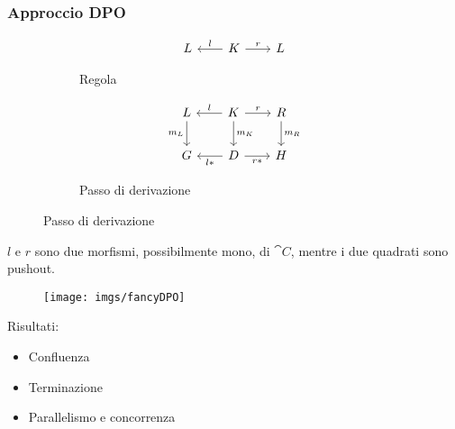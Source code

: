 \documentclass[8pt]{beamer}
\begin{document}
\begin{frame}[fragile]\frametitle{Approccio DPO}
	\begin{figure}[h]
		\begin{subfigure}{0.25\textwidth}
			\[\begin{tikzcd}[row sep = 20, column sep = 20] L & K \arrow[r, "r"] \arrow[l, "l"swap] & L \end{tikzcd}\]
		\label{fig:rule}
		\caption{Regola}
		\end{subfigure}
		\qquad
		\begin{subfigure}{0.25\textwidth}
			\[\begin{tikzcd}[row sep = 20, column sep = 20]
			L \arrow[d, "{m_L}"swap] & K\arrow[d, "{m_K}"] \arrow[r, "r"] \arrow[l, "l"swap] & R \arrow[d, "{m_R}"] \\
				G & D \arrow[l, "{l*}"] \arrow[r, "{r*}"swap] & H
		\end{tikzcd}\]
		\caption{Passo di derivazione}
		\label{fig:step}
		\end{subfigure}
	\end{figure}
	$l$ e $r$ sono due morfismi, possibilmente mono, di $\cat C$, 
	mentre i due quadrati sono pushout.


	\begin{wrapfigure}{ri}{0.5\textwidth}
		\texttt{[image: imgs/fancyDPO]}
	\end{wrapfigure}


	Risultati:
	\begin{itemize}
		\item Confluenza
		\item Terminazione
		\item Parallelismo e concorrenza
	\end{itemize}
\end{frame}
\end{document}
